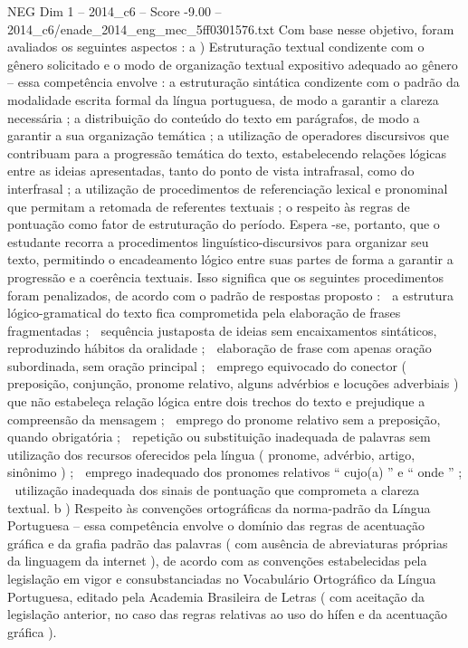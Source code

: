 \begin{textsample}{NEG Dim 1 – 2014\_c6 – Score -9.00 – 2014\_c6/enade\_2014\_eng\_mec\_5ff0301576.txt}
Com base nesse objetivo, foram avaliados os seguintes aspectos : a ) Estruturação textual condizente com o gênero solicitado e o modo de organização textual expositivo adequado ao gênero – essa competência envolve : a estruturação sintática condizente com o padrão da modalidade escrita formal da língua portuguesa, de modo a garantir a clareza necessária ; a distribuição do conteúdo do texto em parágrafos, de modo a garantir a sua organização temática ; a utilização de operadores discursivos que contribuam para a progressão temática do texto, estabelecendo relações lógicas entre as ideias apresentadas, tanto do ponto de vista intrafrasal, como do interfrasal ; a utilização de procedimentos de referenciação lexical e pronominal que permitam a retomada de referentes textuais ; o respeito às regras de pontuação como fator de estruturação do período.
Espera -se, portanto, que o estudante recorra a procedimentos linguístico-discursivos para organizar seu texto, permitindo o encadeamento lógico entre suas partes de forma a garantir a progressão e a coerência textuais.
Isso significa que os seguintes procedimentos foram penalizados, de acordo com o padrão de respostas proposto :  a estrutura lógico-gramatical do texto fica comprometida pela elaboração de frases fragmentadas ;  sequência justaposta de ideias sem encaixamentos sintáticos, reproduzindo hábitos da oralidade ;  elaboração de frase com apenas oração subordinada, sem oração principal ;  emprego equivocado do conector ( preposição, conjunção, pronome relativo, alguns advérbios e locuções adverbiais ) que não estabeleça relação lógica entre dois trechos do texto e prejudique a compreensão da mensagem ;  emprego do pronome relativo sem a preposição, quando obrigatória ;  repetição ou substituição inadequada de palavras sem utilização dos recursos oferecidos pela língua ( pronome, advérbio, artigo, sinônimo ) ;  emprego inadequado dos pronomes relativos “ cujo(a) ” e “ onde ” ;  utilização inadequada dos sinais de pontuação que comprometa a clareza textual. b ) Respeito às convenções ortográficas da norma-padrão da Língua Portuguesa – essa competência envolve o domínio das regras de acentuação gráfica e da grafia padrão das palavras ( com ausência de abreviaturas próprias da linguagem da internet ), de acordo com as convenções estabelecidas pela legislação em vigor e consubstanciadas no Vocabulário Ortográfico da Língua Portuguesa, editado pela Academia Brasileira de Letras ( com aceitação da legislação anterior, no caso das regras relativas ao uso do hífen e da acentuação gráfica ).

\end{textsample}
